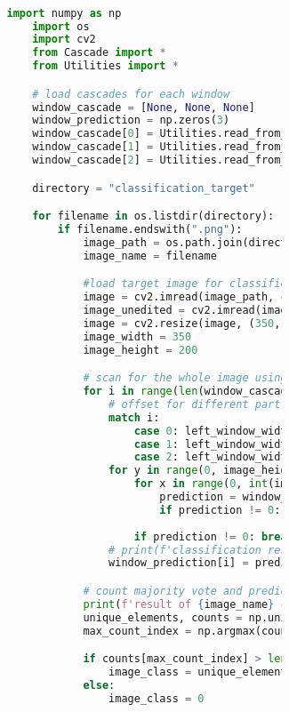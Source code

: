 		\begin{figure}[H]
			\begin{lstlisting}[language=Python, basicstyle=\tiny]

				import numpy as np
					import os
					import cv2
					from Cascade import *
					from Utilities import *

					# load cascades for each window
					window_cascade = [None, None, None]
					window_prediction = np.zeros(3)
					window_cascade[0] = Utilities.read_from_pickle('window_0_cascade') #for left side/mouth detection
					window_cascade[1] = Utilities.read_from_pickle('window_1_cascade') #for mid side/fin detection
					window_cascade[2] = Utilities.read_from_pickle('window_2_cascade') #for right side/tail detection

					directory = "classification_target"

					for filename in os.listdir(directory):
						if filename.endswith(".png"):
							image_path = os.path.join(directory, filename)
							image_name = filename

							#load target image for classification
							image = cv2.imread(image_path, cv2.IMREAD_GRAYSCALE)
							image_unedited = cv2.imread(image_path, cv2.IMREAD_UNCHANGED)
							image = cv2.resize(image, (350, 200))
							image_width = 350
							image_height = 200

							# scan for the whole image using sliding windows
							for i in range(len(window_cascade)):
								# offset for different part all 3 window 
								match i:
									case 0: left_window_width = 0
									case 1: left_window_width = int(image_width / 3)
									case 2: left_window_width = int(image_width / 3 * 2)
								for y in range(0, image_height - 50 + 1):
									for x in range(0, int(image_width / 3) - 50 +1):
										prediction = window_cascade[0].final_cascade_classification(image, x + left_window_width, y)
										if prediction != 0: break
									
									if prediction != 0: break
								# print(f'classification result for window {i}: {prediction}')
								window_prediction[i] = prediction

							# count majority vote and predict class
							print(f'result of {image_name} classification: {window_prediction}')
							unique_elements, counts = np.unique(window_prediction, return_counts=True)
							max_count_index = np.argmax(counts)

							if counts[max_count_index] > len(window_prediction) // 2:
								image_class = unique_elements[max_count_index]
							else:
								image_class = 0


\end{lstlisting}
\end{figure}
